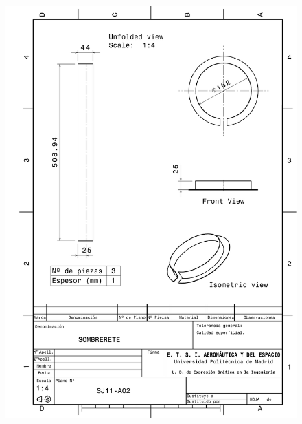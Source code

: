 \begin{figure}
    \centering
    \includegraphics[width=\linewidth]{Figures//Planos/S.pdf}
\end{figure}

